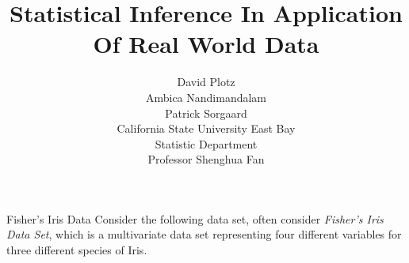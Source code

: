 

\title{Statistical Inference In Application Of Real World Data}

\author{David Plotz\\
Ambica Nandimandalam\\
Patrick Sorgaard \\
\vspace{5mm}
California State University East Bay\\
Statistic Department\\
Professor Shenghua Fan}



\begin{frame}
\titlepage
\end{frame}

\begin{frame}{Fisher's Iris Data}
\indent Consider the following data set, often consider \emph{Fisher's Iris Data Set}, which is a multivariate data set representing four different variables for three different species of Iris.\\
\begin{table}
\begin{center}
\end{center}
\end{table}
\end{frame}

